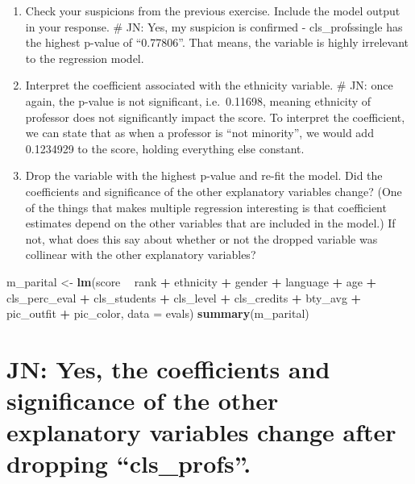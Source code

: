 \documentclass[]{article}
\newenvironment{Shaded}{\begin{snugshade}}{\end{snugshade}}
\newcommand{\KeywordTok}[1]{\textcolor[rgb]{0.13,0.29,0.53}{\textbf{#1}}}
\newcommand{\DataTypeTok}[1]{\textcolor[rgb]{0.13,0.29,0.53}{#1}}
\newcommand{\StringTok}[1]{\textcolor[rgb]{0.31,0.60,0.02}{#1}}
\newcommand{\OperatorTok}[1]{\textcolor[rgb]{0.81,0.36,0.00}{\textbf{#1}}}
\newcommand{\NormalTok}[1]{#1}
\begin{document}
\begin{enumerate}
\def\labelenumi{\arabic{enumi}.}
\setcounter{enumi}{11}
\item
  Check your suspicions from the previous exercise. Include the model
  output in your response. \# JN: Yes, my suspicion is confirmed -
  cls\_profssingle has the highest p-value of ``0.77806''. That means,
  the variable is highly irrelevant to the regression model.
\item
  Interpret the coefficient associated with the ethnicity variable. \#
  JN: once again, the p-value is not significant, i.e.~0.11698, meaning
  ethnicity of professor does not significantly impact the score. To
  interpret the coefficient, we can state that as when a professor is
  ``not minority'', we would add 0.1234929 to the score, holding
  everything else constant.
\item
  Drop the variable with the highest p-value and re-fit the model. Did
  the coefficients and significance of the other explanatory variables
  change? (One of the things that makes multiple regression interesting
  is that coefficient estimates depend on the other variables that are
  included in the model.) If not, what does this say about whether or
  not the dropped variable was collinear with the other explanatory
  variables?
\end{enumerate}

\begin{Shaded}
\begin{Highlighting}[]
\NormalTok{m_parital <-}\StringTok{ }\KeywordTok{lm}\NormalTok{(score }\OperatorTok{~}\StringTok{ }\NormalTok{rank }\OperatorTok{+}\StringTok{ }\NormalTok{ethnicity }\OperatorTok{+}\StringTok{ }\NormalTok{gender }\OperatorTok{+}\StringTok{ }\NormalTok{language }\OperatorTok{+}\StringTok{ }\NormalTok{age }\OperatorTok{+}\StringTok{ }\NormalTok{cls_perc_eval }
             \OperatorTok{+}\StringTok{ }\NormalTok{cls_students }\OperatorTok{+}\StringTok{ }\NormalTok{cls_level }\OperatorTok{+}\StringTok{ }\NormalTok{cls_credits }\OperatorTok{+}\StringTok{ }\NormalTok{bty_avg }
             \OperatorTok{+}\StringTok{ }\NormalTok{pic_outfit }\OperatorTok{+}\StringTok{ }\NormalTok{pic_color, }\DataTypeTok{data =}\NormalTok{ evals)}
\KeywordTok{summary}\NormalTok{(m_parital)}
\end{Highlighting}
\end{Shaded}

\section{\texorpdfstring{JN: Yes, the coefficients and significance of
the other explanatory variables change after dropping
``cls\_profs''.}{JN: Yes, the coefficients and significance of the other explanatory variables change after dropping cls\_profs.}}\label{jn-yes-the-coefficients-and-significance-of-the-other-explanatory-variables-change-after-dropping-cls_profs.}
\end{document}
